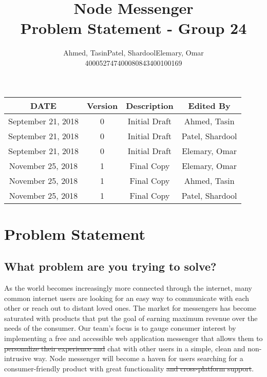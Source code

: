 \documentclass{article}
\title{\Huge\textbf{Node Messenger}\\
		\huge{Problem Statement - Group 24}}
\author{Ahmed, Tasin\hspace{1cm}Patel, Shardool\hspace{1cm}Elemary, Omar \\
		400052747\hspace{2cm}400080843\hspace{2cm}400100169}
\begin{document}
\maketitle
  	
\begin{table}[hp]
\begin{center}
\label{tab:}
\begin{tabular}{|c|c|c|c|}
\hline
\textbf{DATE} & \textbf{Version} & \textbf{Description} & \textbf{Edited By}\\
\hline
September 21, 2018 & 0 & Initial Draft & Ahmed, Tasin\\
\hline
September 21, 2018 & 0 & Initial Draft & Patel, Shardool\\
\hline
September 21, 2018 & 0 & Initial Draft & Elemary, Omar\\
\hline
November 25, 2018 & 1 & Final Copy & Elemary, Omar\\
\hline
November 25, 2018 & 1 & Final Copy & Ahmed, Tasin\\
\hline
November 25, 2018 & 1 & Final Copy & Patel, Shardool\\
\hline
\end{tabular}
\end{center}
\label{default}
\end{table}
	\newpage
	\newpage
	\section{Problem Statement}
	\subsection{What problem are you trying to solve?}
    As the world becomes increasingly more connected through the internet, many common internet users are looking for an easy way to communicate with each other or reach out to distant loved ones. The market for messengers has become saturated with products that put the goal of earning maximum revenue over the needs of the consumer. Our team’s focus is to gauge consumer interest by implementing a free and accessible web application messenger that allows them to \sout{personalize their experience and} chat with other users in a simple, clean and non-intrusive way. Node messenger will become a haven for users searching for a consumer-friendly product with great functionality \sout{and cross-platform support}.
\end{document}
